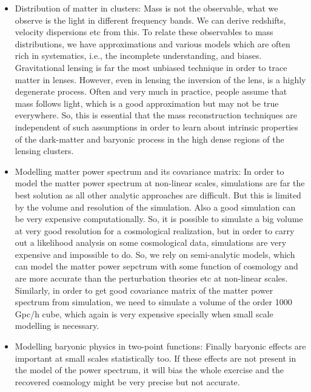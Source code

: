 \begin{itemize}
	\item Distribution of matter in clusters: Mass is not the observable, what we 
			observe is the light in different frequency bands. We can derive 
			redshifts, velocity dispersions etc from this. To relate these observables
			to mass distributions, we have approximations and various models which
			are often rich in systematics, i.e., the incomplete understanding, and 
			biases. Gravitational lensing is far the most unbiased technique in order
			to trace matter in lenses. However, even in lensing the inversion of the lens,
			is a highly degenerate process. Often and very much in 
			practice, people assume that mass follows light, which is a good approximation
			but may not be true everywhere. So, this is essential that the 
			mass reconstruction techniques are independent of such assumptions in order
			to learn about intrinsic properties of the dark-matter and baryonic
			process in the high dense regions of the lensing clusters.

	\item Modelling matter power spectrum and its covariance matrix: In order to model
			the matter power spectrum at non-linear scales, simulations are far the 
			best solution as all other analytic approaches are difficult. But this is limited
			by the volume and resolution of the simulation. Also a good simulation
			can be very expensive computationally. So, it is possible to simulate a big
			volume at very good resolution for a cosmological realization, but in order
			to carry out a likelihood analysis on some cosmological data, simulations are
			very expensive and impossible to do. So, we rely on semi-analytic models, 
			which can model the matter power sepctrum with some function of cosmology
			and are more accurate than the perturbation theories etc at non-linear 
			scales. Similarly, in order to get good covariance matrix of the matter power
			spectrum from simulation, we need to simulate a volume of the order 1000 Gpc/h
			cube, which again is very expensive specially when small scale modelling 
			is necessary. 

	\item Modelling baryonic physics in two-point functions: Finally baryonic effects are 
			important at small scales statistically too. If these effects are not present
			in the model of the power spectrum, it will bias the whole exercise and
			the recovered cosmology might be very precise but not accurate. 
\end{itemize}

